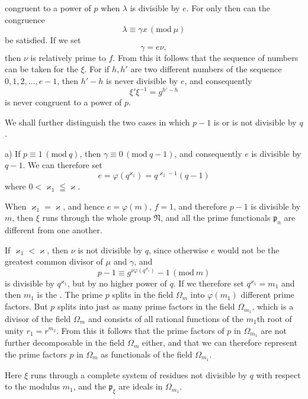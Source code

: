 congruent to a power of $p$ when $\lambda$ is divisible by $e$. For only then can the congruence
\[ \lambda \equiv \gamma x \, (\mathrm{mod}\ \mu) \]
be satisfied. If we set
\[ \gamma = e \nu, \]
then $\nu$ is relatively prime to $f$. From this it follows that the sequence of numbers
can be taken for the $\xi$. For if $h, h'$ are two different numbers of the sequence $0, 1, 2, \ldots, e-1$, then $h'-h$ is never divisible by $e$, and consequently
\[ \xi' \xi^{-1} = g^{h'-h} \]
is never congruent to a power of $p$.

We shall further distinguish the two cases in which $p-1$ is or is not divisible by $q$.

a) If $p \equiv 1 \, (\mathrm{mod}\ q)$, then $\gamma \equiv 0 \, (\mathrm{mod}\ q-1)$, and consequently $e$ is divisible by $q-1$. We can therefore set
\[ e = \varphi(q^{\varkappa_1}) = q^{\varkappa_1 - 1}(q-1) \]
where $0 < \varkappa_1 \leqq \varkappa$.

When $\varkappa_1 = \varkappa$, and hence $e = \varphi(m)$, $f=1$, and therefore $p-1$ is divisible by $m$, then $\xi$ runs through the whole group $\mathfrak{N}$, and all the prime functionals $\mathfrak{p}_n$ are different from one another.

If $\varkappa_1 < \varkappa$, then $\nu$ is not divisible by $q$, since otherwise $e$ would not be the greatest common divisor of $\mu$ and $\gamma$, and
\[ p - 1 \equiv g^{\nu\varphi(q^{\varkappa_1})} - 1 \, (\mathrm{mod}\ m) \]
is divisible by $q^{\varkappa_1}$, but by no higher power of $q$. If we therefore set $q^{\varkappa_1} = m_1$ and
then $m_1$ is the . The prime $p$ splits in the field $\Omega_m$ into $\varphi(m_1)$ different prime factors. But $p$ splits into just as many prime factors in the field $\Omega_{m_1}$, which is a divisor of the field $\Omega_m$ and consists of all rational functions of the $m_1$th root of unity $r_1 = r^{m_2}$. From this it follows that the prime factors of $p$ in $\Omega_{m_1}$ are not further decomposable in the field $\Omega_m$ either, and that we can therefore represent the prime factors $p$ in $\Omega_m$ as functionals of the field $\Omega_{m_1}$.

Here $\xi$ runs through a complete system of residues not divisible by $q$ with respect to the modulus $m_1$, and the $\mathfrak{p}_\xi$ are ideals in $\Omega_{m_1}$.
